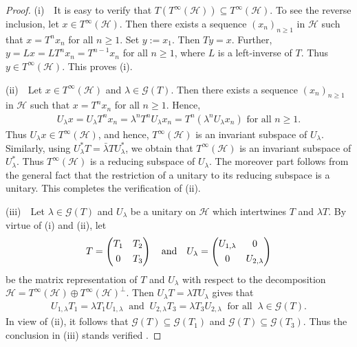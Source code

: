 \documentclass[10pt,a4paper]{amsart}
\newcommand{\beqn}{\begin{eqnarray*}}
\newcommand{\eeqn}{\end{eqnarray*}}
\begin{document}
\begin{proof}
(i)\ \ It is easy to verify that $T(T^\infty(\mathcal H)) \subseteq T^\infty(\mathcal H)$. To see the reverse inclusion, let $x \in T^\infty(\mathcal H)$. Then there exists a sequence $(x_n)_{n \geqslant 1}$ in $\mathcal H$ such that $x = T^n x_n$ for all $n \geqslant 1$. Set $y := x_1$. Then $Ty = x$. Further, $y = Lx = L T^n x_n = T^{n-1} x_n$ for all $n \geqslant 1$, where $L$ is a left-inverse of $T$. Thus $y \in T^\infty(\mathcal H)$. This proves (i).

(ii)\ \ Let $x \in T^\infty(\mathcal H)$ and $\lambda \in \mathcal G(T)$. Then there exists a sequence $(x_n)_{n \geqslant 1}$ in $\mathcal H$ such that $x = T^n x_n$ for all $n \geqslant 1$. Hence,
\beqn
U_\lambda x = U_\lambda T^n x_n = \lambda^n T^n U_\lambda x_n = T^n(\lambda^n U_\lambda x_n) \mbox{ for all } n \geqslant 1.
\eeqn
Thus $U_\lambda x \in T^\infty(\mathcal H)$, and hence, $T^\infty(\mathcal H)$ is an invariant subspace of $U_\lambda$. Similarly, using $U^*_\lambda T = \bar \lambda T U^*_\lambda$, we obtain that $T^\infty(\mathcal H)$ is an invariant subspace of $U^*_\lambda$. Thus $T^\infty(\mathcal H)$ is a reducing subspace of $U_\lambda$. The moreover part follows from the general fact that the restriction of a unitary to its reducing subspace is a unitary. This completes the verification of (ii).

(iii)\ \ Let $\lambda \in \mathcal G(T)$ and $U_\lambda$ be a unitary on $\mathcal H$ which intertwines $T$ and $\lambda T$. By virtue of (i) and (ii), let 
\beqn
T = \left(\begin{matrix}
T_1 & T_2\\
&\vspace{-.3cm}\\
0 & T_3 \end{matrix}\right) \quad \mbox{and} \quad  U_\lambda = \left(\begin{matrix}
U_{1,\lambda} & 0\\
&\vspace{-.3cm}\\
0 & U_{2, \lambda} \end{matrix}\right)
\eeqn
be the matrix representation of $T$ and $U_\lambda$ with respect to the decomposition $\mathcal H = T^\infty(\mathcal H) \oplus T^\infty(\mathcal H)^\bot$. Then $U_\lambda T = \lambda T U_\lambda$ gives that
\beqn
U_{1,\lambda} T_1 = \lambda T_1 U_{1, \lambda}\ \mbox{ and }\ U_{2,\lambda} T_3 = \lambda T_3 U_{2, \lambda}\ \mbox{ for all }\ \lambda \in \mathcal G(T).
\eeqn
In view of (ii), it follows that $\mathcal G(T) \subseteq \mathcal G(T_1)$ and $\mathcal G(T) \subseteq \mathcal G(T_3)$. Thus the conclusion in (iii) stands verified .


\end{proof}
\end{document}
